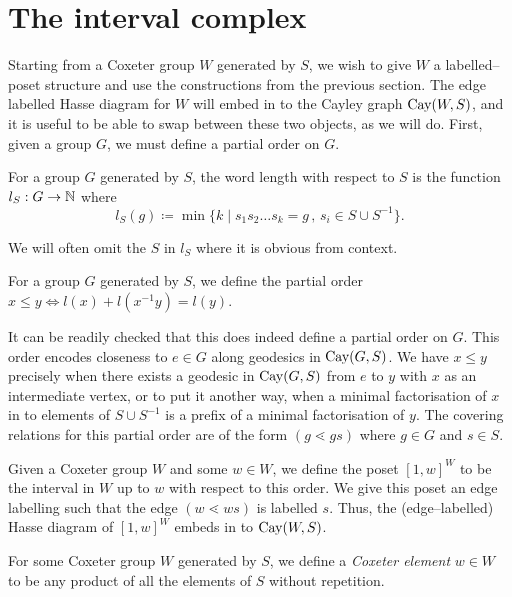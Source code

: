 \documentclass[class=article, crop=false]{standalone}
\begin{document}
\section{The interval complex}
\label{sec:interval_cx}
Starting from a Coxeter group $W$ generated by $S$, we wish to give $W$ a labelled--poset structure and use the constructions from the previous section. The edge labelled Hasse diagram for $W$ will embed in to the Cayley graph $\text{Cay}(W,S)$, and it is useful to be able to swap between these two objects, as we will do. First, given a group $G$, we must define a partial order on $G$.

\begin{definition}
	For a group $G$ generated by $S$, the word length with respect to $S$ is the function $l_S:G\to \mathbb{\mathbb{N}}$ where
	\begin{equation*}
		l_S(g) \coloneq \min\{k \mid s_1s_2\ldots s_k=g \,,\, s_i \in S \cup S^{-1}\}.
	\end{equation*}
\end{definition}
We will often omit the $S$ in $l_S$ where it is obvious from context.

\begin{definition}
	For a group $G$ generated by $S$, we define the partial order $x \leq y \iff l(x) + l(x^{-1}y) = l(y)$.
\end{definition}

It can be readily checked that this does indeed define a partial
order on $G$. This order encodes closeness to $e \in G$ along geodesics in $\text{Cay}(G,S)$. We have $x \leq y$ precisely when there exists a geodesic in $\text{Cay}(G, S)$ from $e$ to $y$ with $x$ as an intermediate vertex, or to put it another way, when a minimal factorisation of $x$ in to elements of $S \cup S^{-1}$ is a prefix of a minimal factorisation of $y$. The covering relations for this partial order are of the form $(g \lessdot gs)$ where $g \in G$ and $s \in S$.


Given a Coxeter group $W$ and some $w \in W$, we define the poset $[1,w]^W$ to be the interval in $W$ up to $w$ with respect to this order. We give this poset an edge labelling such that the edge $(w \lessdot ws)$ is labelled $s$. Thus, the (edge--labelled) Hasse diagram of $[1,w]^W$ embeds in to $\text{Cay}(W,S)$.

\begin{definition}
	For some Coxeter group $W$ generated by $S$, we define a \emph{Coxeter element} $w\in W$ to be any product of all the elements of $S$ without repetition.
\end{definition}
\end{document}
